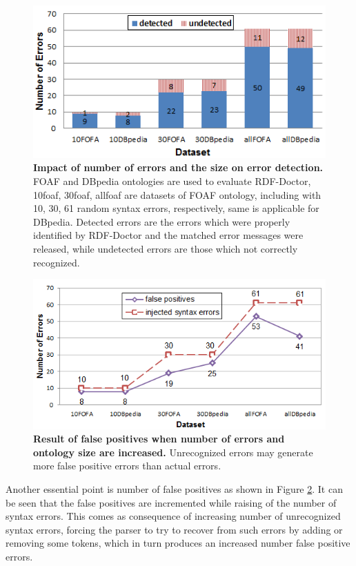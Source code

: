 \begin{figure}[ht]
\begin{center}
		\includegraphics[scale=0.9,angle=0]{images/Experiment03-01.png}
				\setlength\belowcaptionskip{-5mm}
		\caption{\textbf{Impact of number of errors and the size on error detection.} 
		FOAF and DBpedia ontologies are used to evaluate RDF-Doctor, 10foaf, 30foaf, allfoaf are datasets of FOAF ontology, including with 10, 30, 61 random syntax errors, respectively, same is applicable for DBpedia. Detected errors are the errors which were properly identified by RDF-Doctor and the matched error messages were released, while undetected errors are those which not correctly recognized.}
		\label{Fig:Experiment03-01}

\end{center}
\end{figure}


\begin{figure}[ht]
\begin{center}
		\includegraphics[scale=0.9,angle=0]{images/Experiment03-02.png}
		\setlength\belowcaptionskip{-5mm}
		\setlength\abovecaptionskip{-50mm}
		\caption{\textbf{Result of false positives when number of errors and ontology size are increased.} Unrecognized errors may generate more false positive errors than actual errors. 
		}
   \label{Fig:Experiment03-02}
\end{center}
\end{figure}
Another essential point is number of false positives as shown in Figure \ref{Fig:Experiment03-02}. 
It can be seen that the false positives are incremented while raising of the number of syntax errors.
This comes as consequence of increasing number of unrecognized syntax errors, forcing the parser to try to recover from such errors by adding or removing some tokens, which in turn produces an increased number false positive errors.   


